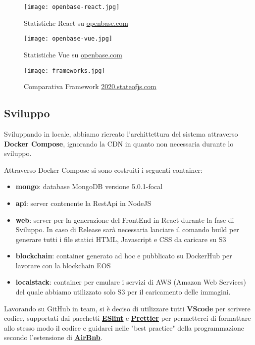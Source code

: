 \begin{figure} 
	\centering
	\texttt{[image: openbase-react.jpg]}
	\caption{Statistiche React su \underline{\href{https://openbase.com/js/react}{openbase.com}}}
	\label{fig:openbaseReact}
\end{figure}
\begin{figure} 
	\centering
	\texttt{[image: openbase-vue.jpg]}
	\caption{Statistiche Vue su \underline{\href{https://openbase.com/js/vue}{openbase.com}}}
	\label{fig:openbaseVue}
\end{figure}
\begin{figure} 
	\centering
	\texttt{[image: frameworks.jpg]}
	\caption{Comparativa Framework \underline{\href{https://2020.stateofjs.com/en-US/technologies/front-end-frameworks/}{2020.stateofjs.com}}}
	\label{fig:frameworks}
\end{figure}

\clearpage

\subsection{Sviluppo}
Sviluppando in locale, abbiamo ricreato l'archittettura del sistema attraverso \textbf{Docker Compose}, 
ignorando la CDN in quanto non necessaria durante lo sviluppo.

Attraverso Docker Compose si sono costruiti i seguenti container:
\begin{itemize}
	\item \textbf{mongo}: database MongoDB versione 5.0.1-focal
	\item \textbf{api}: server contenente la RestApi in NodeJS
	\item \textbf{web}: server per la generazione del FrontEnd in React durante la fase di Sviluppo. In caso di Release sarà necessaria lanciare il comando build per generare tutti i file statici HTML, Javascript e CSS da caricare su S3
	\item \textbf{blockchain}: container generato ad hoc e pubblicato su DockerHub per lavorare con la blockchain EOS
	\item \textbf{localstack}: container per emulare i servizi di AWS (Amazon Web Services) del quale abbiamo utilizzato solo S3 per il caricamento delle immagini.
\end{itemize}

Lavorando su GitHub in team, si è deciso di utilizzare tutti \textbf{VScode} per scrivere codice, 
supportati dai pacchetti \textbf{\underline{\href{https://eslint.org/docs/user-guide/getting-started}{ESlint}}} e \textbf{\underline{\href{https://prettier.io/docs/en/index.html}{Prettier}}} per permetterci di formattare allo stesso modo il codice
e guidarci nelle "best practice" della programmazione secondo l'estensione di  \textbf{\underline{\href{https://www.npmjs.com/package/eslint-config-airbnb}{AirBnb}}}.


